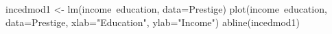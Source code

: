 \begin{Schunk}
\begin{Sinput}
 incedmod1 <- lm(income~education, data=Prestige)
 plot(income~education, data=Prestige, xlab="Education", ylab="Income")
 abline(incedmod1)
\end{Sinput}
\end{Schunk}
